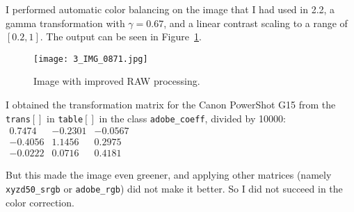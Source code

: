 \documentclass[11pt,a4]{article}
\begin{document}
I performed automatic color balancing on the image that I had used in 2.2, a gamma transformation with $\gamma = 0.67$, and a linear contrast scaling to a range of $[0.2,1]$. The output can be seen in Figure~\ref{img:bonus}.

\begin{figure}[htb]
    \begin{center}
        \texttt{[image: 3\_IMG\_0871.jpg]}
        \caption{Image with improved RAW processing.\label{img:bonus}}
    \end{center}
\end{figure}

I obtained the transformation matrix for the Canon PowerShot G15 from the \texttt{trans$[]$} in \texttt{table$[]$} in the class \texttt{adobe\_coeff}, divided by 10000:\\
$\begin{matrix}
       0.7474 & -0.2301 & -0.0567           \\
       -0.4056 & 1.1456           & 0.2975 \\
       -0.0222         & 0.0716 & 0.4181
\end{matrix}$

But this made the image even greener, and applying other matrices (namely \texttt{xyzd50\_srgb} or \texttt{adobe\_rgb}) did not make it better. So I did not succeed in the color correction.
\end{document}
